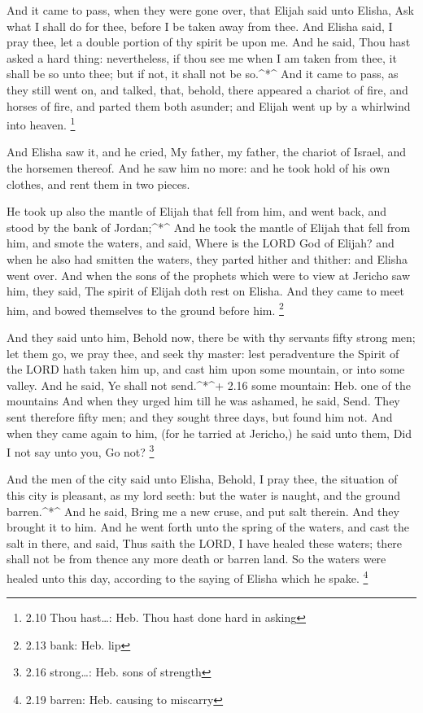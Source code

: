  And it came to pass, when they were gone over, that Elijah
said unto Elisha, Ask what I shall do for thee, before I be taken away
from thee. And Elisha said, I pray thee, let a double portion of thy
spirit be upon me.  And he said, Thou hast asked a hard
thing: nevertheless, if thou see me when I am taken from thee, it shall
be so unto thee; but if not, it shall not be so.\^{}*\^{} 
And it came to pass, as they still went on, and talked, that, behold,
there appeared a chariot of fire, and horses of fire, and parted them
both asunder; and Elijah went up by a whirlwind into heaven. \footnote{2.10
  Thou hast\ldots: Heb. Thou hast done hard in asking}

 And Elisha saw it, and he cried, My father, my father, the
chariot of Israel, and the horsemen thereof. And he saw him no more: and
he took hold of his own clothes, and rent them in two pieces.

 He took up also the mantle of Elijah that fell from him,
and went back, and stood by the bank of Jordan;\^{}*\^{} 
And he took the mantle of Elijah that fell from him, and smote the
waters, and said, Where is the LORD God of Elijah? and when he also had
smitten the waters, they parted hither and thither: and Elisha went
over.  And when the sons of the prophets which were to view
at Jericho saw him, they said, The spirit of Elijah doth rest on Elisha.
And they came to meet him, and bowed themselves to the ground before
him. \footnote{2.13 bank: Heb. lip}

 And they said unto him, Behold now, there be with thy
servants fifty strong men; let them go, we pray thee, and seek thy
master: lest peradventure the Spirit of the LORD hath taken him up, and
cast him upon some mountain, or into some valley. And he said, Ye shall
not send.\^{}*\^{}+ 2.16 some mountain: Heb. one of the mountains
 And when they urged him till he was ashamed, he said,
Send. They sent therefore fifty men; and they sought three days, but
found him not.  And when they came again to him, (for he
tarried at Jericho,) he said unto them, Did I not say unto you, Go not?
\footnote{2.16 strong\ldots: Heb. sons of strength}

 And the men of the city said unto Elisha, Behold, I pray
thee, the situation of this city is pleasant, as my lord seeth: but the
water is naught, and the ground barren.\^{}*\^{}  And he
said, Bring me a new cruse, and put salt therein. And they brought it to
him.  And he went forth unto the spring of the waters, and
cast the salt in there, and said, Thus saith the LORD, I have healed
these waters; there shall not be from thence any more death or barren
land.  So the waters were healed unto this day, according
to the saying of Elisha which he spake. \footnote{2.19 barren: Heb.
  causing to miscarry}

